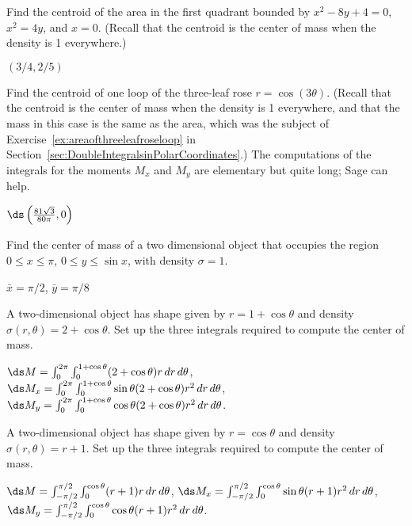 \begin{enumialphparenastyle}
\begin{ex}
Find the centroid of the area in the first quadrant bounded by
 $x^2-8y+4=0$, $x^2=4y$, and $x=0$. (Recall that the centroid
is the center of mass when the density is 1 everywhere.)
\begin{sol}
$(3/4,2/5)$
\end{sol}
\end{ex}

\begin{ex}
Find the centroid of one loop of the three-leaf rose
$r=\cos(3\theta)$.  (Recall that the centroid is the
center of mass when the density is 1 everywhere, and that the mass in
this case is the same as the area, which was the subject of
Exercise~\ref{ex:areaofthreeleafroseloop} in
Section~\ref{sec:DoubleIntegralsinPolarCoordinates}.)  The
computations of the integrals for the moments $M_x$ and $M_y$ are
elementary but quite long; Sage can help.
\begin{sol}
$\ds\left({81\sqrt3\over80\pi},0\right)$
\end{sol}
\end{ex}

\begin{ex}
Find the center of mass of a two dimensional
object that occupies the region $0\le x\le \pi$, $0\le y\le \sin x$,
with density $\sigma=1$.
\begin{sol}
$\bar x=\pi/2$, $\bar y=\pi/8$ 
\end{sol}
\end{ex}

\begin{ex}
A two-dimensional object has shape given by 
$r=1+\cos\theta$ and density $\sigma(r,\theta)=2+\cos\theta$. Set up
the three integrals required to compute the center of mass.
\begin{sol}
$\ds M=\int_0^{2\pi} \int_0^{1+\cos\theta} (2+\cos\theta)r\,dr\,d\theta$,
\hfill\break
$\ds M_x=\int_0^{2\pi} \int_0^{1+\cos\theta} \sin\theta(2+\cos\theta)r^2\,dr\,d\theta$,
\hfill\break
$\ds M_y=\int_0^{2\pi} \int_0^{1+\cos\theta} \cos\theta(2+\cos\theta)r^2\,dr\,d\theta$.
\end{sol}
\end{ex}

\begin{ex}
A two-dimensional object has shape given by 
$r=\cos\theta$ and density $\sigma(r,\theta)=r+1$. Set up
the three integrals required to compute the center of mass.
\begin{sol}
$\ds M=\int_{-\pi/2}^{\pi/2} \int_0^{\cos\theta} (r+1)r\,dr\,d\theta$,
\hfill\break
$\ds M_x=\int_{-\pi/2}^{\pi/2} \int_0^{\cos\theta} \sin\theta(r+1)r^2\,dr\,d\theta$,
\hfill\break
$\ds M_y=\int_{-\pi/2}^{\pi/2} \int_0^{\cos\theta} \cos\theta(r+1)r^2\,dr\,d\theta$.
\end{sol}
\end{ex}


\end{enumialphparenastyle}
